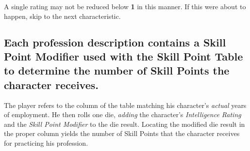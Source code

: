 A single rating may not be reduced below \textbf{1} in this manner. If
this were about to happen, skip to the next characteristic.

\begin{table}[htbp]
  \centering
\end{table}


\subsection[Skill Point Modifier]{Each profession description contains
  a Skill  Point 
  Modifier used with the Skill Point Table to determine the number of
  Skill Points the character  receives.}
\label{sec:each-prof-descr}

The player refers to the column of the table matching his character's
\emph{actual} years of employment. He then rolls one die,
\emph{adding} the character's \emph{Intelligence Rating} and the
\emph{Skill Point Modifier} to the die result. Locating the modified
die result in the proper column yields the number of Skill Points that
the character receives for practicing his profession.

